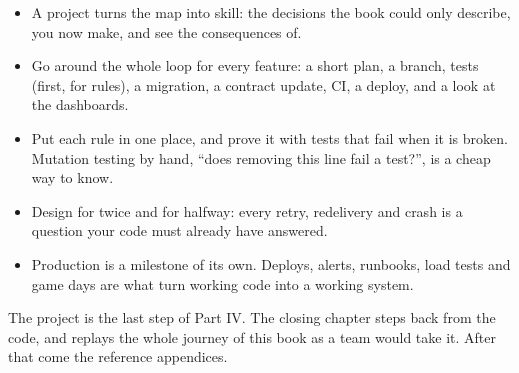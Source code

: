 \label{44-project-notes-for-many-users:key-takeaways}
\begin{takeaways}

\begin{itemize}
\tightlist
\item
  A project turns the map into skill: the decisions the book could only describe, you now make, and see the consequences of.
\item
  Go around the whole loop for every feature: a short plan, a branch, tests (first, for rules), a migration, a contract update, CI, a deploy, and a look at the dashboards.
\item
  Put each rule in one place, and prove it with tests that fail when it is broken. Mutation testing by hand, ``does removing this line fail a test?'', is a cheap way to know.
\item
  Design for twice and for halfway: every retry, redelivery and crash is a question your code must already have answered.
\item
  Production is a milestone of its own. Deploys, alerts, runbooks, load tests and game days are what turn working code into a working system.
\end{itemize}

\end{takeaways}

\label{44-project-notes-for-many-users:whats-next}

The project is the last step of Part IV. The closing chapter steps back from the code, and replays the whole journey of this book as a team would take it. After that come the reference appendices.
